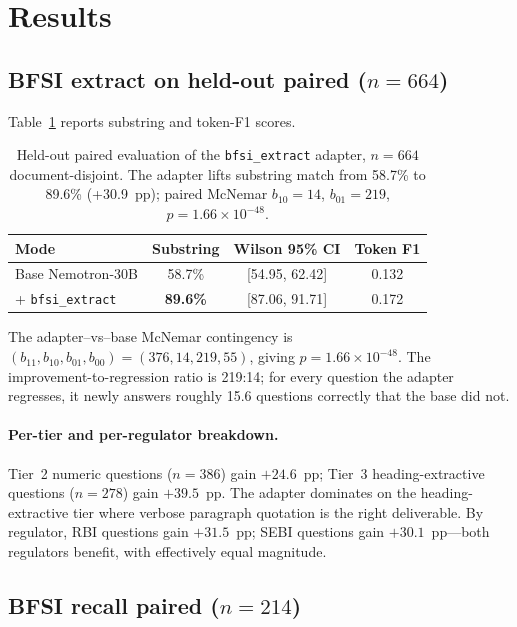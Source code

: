 \documentclass{article}
\begin{document}
\section{Results}
\label{sec:results}

\subsection{BFSI extract on held-out paired ($n{=}664$)}

Table~\ref{tab:extract-main} reports substring and token-F1 scores.

\begin{table}[h]
  \caption{Held-out paired evaluation of the \texttt{bfsi\_extract} adapter, $n{=}664$ document-disjoint. The adapter lifts substring match from 58.7\% to 89.6\% (+30.9~pp); paired McNemar $b_{10}{=}14$, $b_{01}{=}219$, $p{=}1.66\times10^{-48}$.}
  \label{tab:extract-main}
  \centering
  \begin{tabular}{lccc}
    \toprule
    Mode & Substring & Wilson 95\% CI & Token F1 \\
    \midrule
    Base Nemotron-30B & 58.7\% & [54.95, 62.42] & 0.132 \\
    + \texttt{bfsi\_extract} & \textbf{89.6\%} & [87.06, 91.71] & 0.172 \\
    \bottomrule
  \end{tabular}
\end{table}

The adapter--vs--base McNemar contingency is $(b_{11}, b_{10}, b_{01}, b_{00}) = (376,14,219,55)$, giving $p{=}1.66\times10^{-48}$. The improvement-to-regression ratio is 219:14; for every question the adapter regresses, it newly answers roughly 15.6 questions correctly that the base did not.

\paragraph{Per-tier and per-regulator breakdown.} Tier~2 numeric questions ($n{=}386$) gain $+24.6$~pp; Tier~3 heading-extractive questions ($n{=}278$) gain $+39.5$~pp. The adapter dominates on the heading-extractive tier where verbose paragraph quotation is the right deliverable. By regulator, RBI questions gain $+31.5$~pp; SEBI questions gain $+30.1$~pp---both regulators benefit, with effectively equal magnitude.

\subsection{BFSI recall paired ($n{=}214$)}
\label{sec:results-recall}
\end{document}
